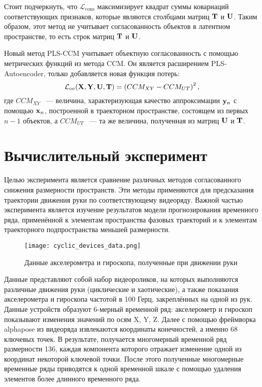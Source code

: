 \documentclass[a4paper, 12pt]{article}
\begin{document}
Стоит подчеркнуть, что $\mathcal{L}_{\text{cons}}$ максимизирует квадрат суммы ковариаций соответствующих признаков, которые являются столбцами матриц $\mathbf{T}$ и $\mathbf{U}$. 
Таким образом, этот метод не учитывает согласованность объектов в латентном пространстве, то есть строк матриц $\mathbf{T}$ и $\mathbf{U}$.

Новый метод PLS-CCM учитывает объектную согласованность с помощью метрических функций из метода CCM. Он является расширением PLS-Autoencoder, только добавляется новая функция потерь:
$$ \mathcal{L}_\text{oc}(\mathbf{X}, \mathbf{Y}, \mathbf{U}, \mathbf{T}) = \left( CCM_{XY} - CCM_{UT} \right)^2 ,$$
где $CCM_{XY}$ ~--- величина, характеризующая качество аппроксимации $\mathbf{y}_n$ с помощью $\mathbf{x}_n$, построенной в траекторном пространстве, состоящем из первых $n-1$ объектов, а $CCM_{UT}$ ~--- та же величина, полученная из матриц $\mathbf{U}$ и $\mathbf{T}$.

\section{Вычислительный эксперимент}
Целью эксперимента является сравнение различных методов согласованного снижения размерности пространств. 
Эти методы применяются для предсказания траектории движения руки по соответствующему видеоряду.
Важной частью эксперимента является изучение результатов модели прогнозирования временного ряда, применённой к элементам пространства фазовых траекторий и к элементам траекторного подпространства меньшей размерности.

\begin{figure}[bhtp]
	\texttt{[image: cyclic\_devices\_data.png]}
	\caption{Данные акселерометра и гироскопа, полученные при движении руки}
	\label{fig:devices_data}
\end{figure}
Данные представляют собой набор видеороликов, на которых выполняются различные движения руки (циклические и хаотические), а также показания акселерометра и гироскопа частотой в 100 Герц, закреплённых на одной из рук. 
Данные устройств образуют 6-мерный временной ряд: акселерометр и гироскоп показывают изменения значений по осям X, Y, Z.
Далее с помощью фреймворка alphapose \citep{alphapose_fang2017rmpe, alphapose_li2019crowdpose, alphapose_xiu2018poseflow} из видеоряда извлекаются координаты конечностей, а именно 68 ключевых точек. 
В результате, получается многомерный временной ряд размерности 136, каждая компонента которого отражает изменение одной из координат некоторой ключевой точки.
После этого полученные многомерные временные ряды приводятся к одной временной шкале с помощью удаления элементов более длинного временного ряда.
\end{document}
